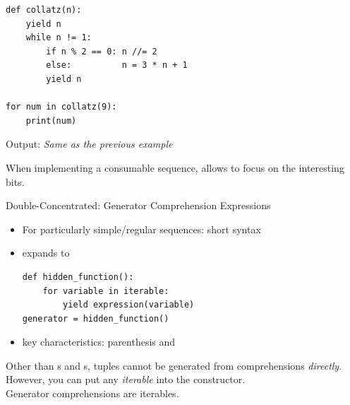 
\begin{frame}[fragile]
%
\begin{codebox}
\begin{verbatim}
def collatz(n):
    yield n
    while n != 1:
        if n % 2 == 0: n //= 2
        else:          n = 3 * n + 1
        yield n

for num in collatz(9):
    print(num)
\end{verbatim}
\end{codebox}
%
Output: \emph{Same as the previous example}
%
\begin{hintbox}
When implementing a consumable sequence,  allows to focus on the interesting bits.
\end{hintbox}
%
\end{frame}


\begin{frame}[fragile]{Double-Concentrated: Generator Comprehension Expressions}
%
\begin{itemize}
\item For particularly simple/regular sequences: short syntax
	\begin{codebox}[]
	\footnotesize
	\end{codebox}
\item expands to
\begin{codebox}[]
\begin{verbatim}
def hidden_function():
    for variable in iterable:
        yield expression(variable)
generator = hidden_function()
\end{verbatim}
\end{codebox}
\item[\Thus] key characteristics: parenthesis and 
\end{itemize}
%
\end{frame}


\begin{frame}

\begin{hintbox}
Other than s and s, tuples cannot be generated from comprehensions \emph{directly}. However, you can put any \emph{iterable} into the  constructor.\\
Generator comprehensions are iterables.

\vspace{6pt}
\Thus {}
\end{hintbox}
%
\end{frame}

